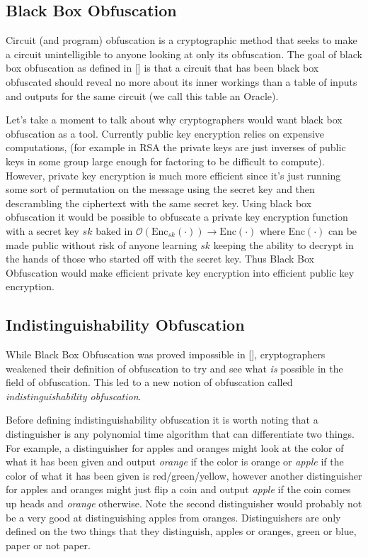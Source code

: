 \documentclass[12pt,twoside]{reedthesis}
\newcommand{\enc}[0]{\text{Enc}}
\begin{document}
    \subsection{Black Box Obfuscation}
     \par Circuit (and program) obfuscation is a cryptographic method that seeks to make a circuit unintelligible to anyone looking at only its obfuscation. The goal of black box obfuscation as defined in [\cite{vbb}] is that a circuit that has been black box obfuscated should reveal no more about its inner workings than a table of inputs and outputs for the same circuit (we call this table an Oracle).
         
     \par Let's take a moment to talk about why cryptographers would want black box obfuscation as a tool. Currently public key encryption relies on expensive computations, (for example in RSA the private keys are just inverses of public keys in some group large enough for factoring to be difficult to compute). However, private key encryption is much more efficient since it's just running some sort of permutation on the message using the secret key and then descrambling the ciphertext with the same secret key. Using black box obfuscation it would be possible to obfuscate a private key encryption function with a secret key $sk$ baked in $\mathcal{O}(\enc_{sk}(\cdot)) \rightarrow \enc(\cdot)$ where $\enc(\cdot)$ can be made public without risk of anyone learning $sk$ keeping the ability to decrypt in the hands of those who started off with the secret key. Thus Black Box Obfuscation would make efficient private key encryption into efficient public key encryption.
    
    
    
    \subsection{Indistinguishability Obfuscation}
   
   
    While Black Box Obfuscation was proved impossible in [\cite{vbb}], cryptographers weakened their definition of obfuscation to try and see what \textit{is} possible in the field of obfuscation. This led to a new notion of obfuscation called \textit{indistinguishability obfuscation}. 
    \par Before defining indistinguishability obfuscation it is worth noting that a distinguisher is any polynomial time algorithm that can differentiate two things. For example, a distinguisher for apples and oranges might look at the color of what it has been given and output  \textit{orange} if the color is orange or \textit{apple} if the color of what it has been given is red/green/yellow, however another distinguisher for apples and oranges might just flip a coin and output \textit{apple} if the coin comes up heads and \textit{orange} otherwise. Note the second distinguisher would probably not be a very good at distinguishing apples from oranges. Distinguishers are only defined on the two things that they distinguish, apples or oranges, green or blue, paper or not paper.
       \newcommand{\iO}[0]{\textit{i}\mathcal{O}}
    
\end{document}
